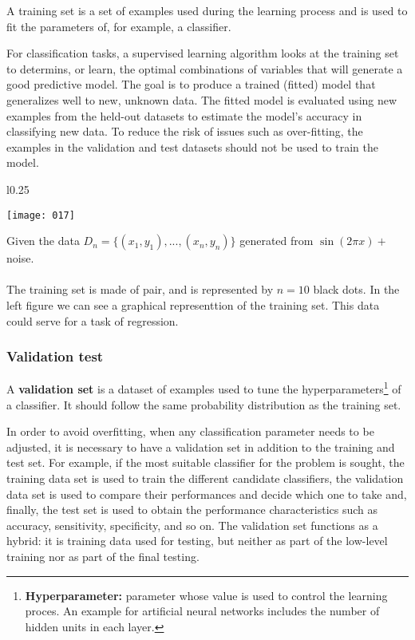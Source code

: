 A training set is a set of examples used during the learning process and is used to fit the parameters of, for example, a classifier.

For classification tasks, a supervised learning algorithm looks at the training set to determins, or learn, the optimal combinations of variables that will generate a good predictive model. The goal is to produce a trained (fitted) model that generalizes well to new, unknown data. The fitted model is evaluated using new examples from the held-out datasets to estimate the model's accuracy in classifying new data. To reduce the risk of issues such as over-fitting, the examples in the validation and test datasets should not be used to train the model.

\begin{example}
\begin{wrapfigure}{l}{0.25\textwidth}
\begin{center}
    \texttt{[image: 017]}
    \label{fig:017}
\end{center}
\end{wrapfigure}
Given the data \(D_n=\{(x_1,y_1),...,(x_n,y_n)\}\) generated from \(\sin(2 \pi x) + \)noise.\\
\\
The training set is made of pair, and is represented by \(n=10\) black dots. In the left figure we can see a graphical representtion of the training set. This data could serve for a task of regression.

\end{example}

\subsubsection{Validation test}
A \textbf{validation set} is a dataset of examples used to tune the hyperparameters\footnote{\textbf{Hyperparameter:}  parameter whose value is used to control the learning proces. An example for artificial neural networks includes the number of hidden units in each layer.} of a classifier. It should follow the same probability distribution as the training set.

In order to avoid overfitting, when any classification parameter needs to be adjusted, it is necessary to have a validation set in addition to the training and test set. For example, if the most suitable classifier for the problem is sought, the training data set is used to train the different candidate classifiers, the validation data set is used to compare their performances and decide which one to take and, finally, the test set is used to obtain the performance characteristics such as accuracy, sensitivity, specificity, and so on. The validation set functions as a hybrid: it is training data used for testing, but neither as part of the low-level training nor as part of the final testing.

